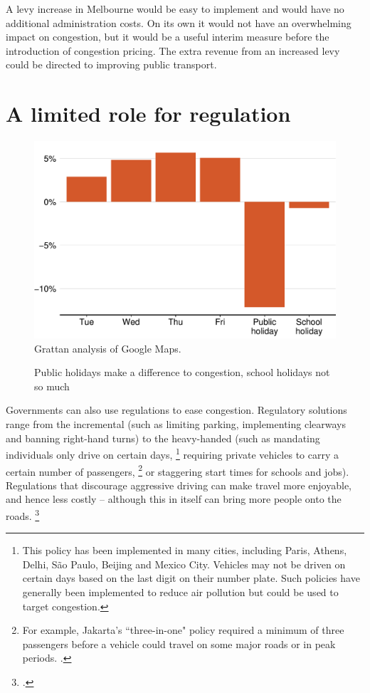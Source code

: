 \documentclass{grattan}
\begin{document}
A levy increase in Melbourne would be easy to implement and would have no additional administration costs.
On its own it would not have an overwhelming impact on congestion, but it would be a useful interim measure before the introduction of congestion pricing.
The extra revenue from an increased levy could be directed to improving public transport.


\section{A limited role for regulation}\label{sec:Regulations}

\begin{figure}[p]
\caption{Public holidays make a difference to congestion, school holidays not so much}\label{fig:congestion-school-holidays}
\includegraphics{atlas/simpleModelPlot-1.pdf}
%
{Grattan analysis of Google Maps.}
\end{figure}

Governments can also use regulations to ease congestion. Regulatory solutions range from the incremental (such as limiting parking, implementing clearways and banning right-hand turns) to the heavy-handed (such as mandating individuals only drive on certain days,%
    \footnote{This policy has been implemented in many cities, including Paris, Athens, Delhi, São Paulo, Beijing and Mexico City.
Vehicles may not be driven on certain days based on the last digit on their number plate.
Such policies have generally been implemented to reduce air pollution but could be used to target congestion.}
requiring private vehicles to carry a certain number of passengers,%
    \footnote{For example, Jakarta’s “three-in-one" policy required a minimum of three passengers before a vehicle could travel on some major roads  or in peak periods. \textcite{HOV-Jakarta}.}
or staggering start times for schools and jobs).
Regulations that discourage aggressive driving can make travel more enjoyable, and hence less costly -- although this in itself can bring more people onto the roads.%
\footcite[][10--11]{Arnott-2001-Microscopic-research-agenda}
\end{document}
